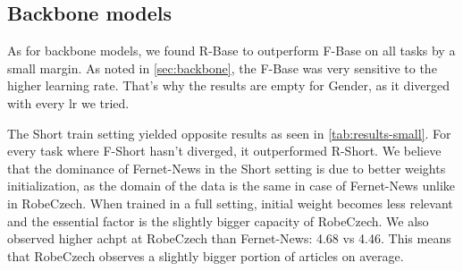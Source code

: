\subsection{Backbone models}
As for backbone models, we found R-Base to outperform F-Base on all tasks by a small margin.
As noted in \autoref{sec:backbone}, the F-Base was very sensitive to the higher learning rate.
That's why the results are empty for Gender, as it diverged with every \ac{lr} we tried.
\begin{table}[h]
\end{table}

The Short train setting yielded opposite results as seen in \autoref{tab:results-small}.
For every task where F-Short hasn't diverged, it outperformed R-Short.
We believe that the dominance of Fernet-News in the Short setting is due to
better weights initialization, as the domain of the data is the same
in case of Fernet-News unlike in RobeCzech.
When trained in a full setting, initial weight becomes less relevant and the essential
factor is the slightly bigger capacity of RobeCzech. We also observed
higher \ac{achpt} at RobeCzech than Fernet-News: 4.68 vs 4.46.
This means that RobeCzech observes a slightly bigger portion of articles on average.

